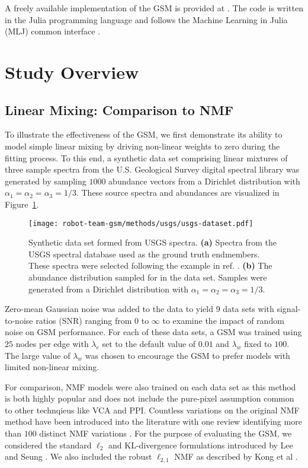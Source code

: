 A freely available implementation of the GSM is provided at \cite{gtm-code}. The
code is written in the Julia programming language and follows the Machine
Learning in Julia (MLJ) common interface \cite{bezanson2012julia, blaom2020mlj}.


\section{Study Overview}

\subsection{Linear Mixing: Comparison to NMF}\label{sec:experiments}

To illustrate the effectiveness of the GSM, we first demonstrate its ability to
model simple linear mixing by driving non-linear weights to zero during the
fitting process. To this end, a synthetic data set comprising linear mixtures of
three sample spectra from the U.S. Geological Survey digital spectral library
\cite{usgs-spectra} was generated by sampling $1000$ abundance vectors from a
Dirichlet distribution with $\alpha_1=\alpha_2=\alpha_3=1/3$. These source
spectra and abundances are visualized in Figure~\ref{fig:usgs-data}.

\begin{figure}[H]
  \centering
  \texttt{[image: robot-team-gsm/methods/usgs/usgs-dataset.pdf]}
  \caption{Synthetic data set formed from USGS spectra. \textbf{(a)} Spectra
    from the USGS spectral database used as the ground truth endmembers. These
    spectra were selected following the example in ref. \cite{vca-orig}.
    \textbf{(b)} The abundance distribution sampled for in the data set. Samples
    were generated from a Dirichlet distribution with
    $\alpha_1=\alpha_2=\alpha_3=1/3$.}
  \label{fig:usgs-data}
\end{figure}

Zero-mean Gaussian noise was added to the data to yield $9$ data sets with
signal-to-noise ratios (SNR) ranging from $0$ to $\infty$ to examine the impact
of random noise on GSM performance. For each of these data sets, a GSM was
trained using $25$ nodes per edge with $\lambda_e$ set to the default value of
$0.01$ and $\lambda_w$ fixed to $100$. The large value of $\lambda_w$ was chosen
to encourage the GSM to prefer models with limited non-linear mixing.


For comparison, NMF models were also trained on each data set as this method is
both highly popular and does not include the pure-pixel assumption common to
other technqieus like VCA and PPI. Countless variations on the original NMF
method have been introduced into the literature with one review identifying more
than $100$ distinct NMF variations \cite{unmixing-nmf-review}. For the purpose
of evaluating the GSM, we considered the standard $\ell_2$ and KL-divergence
formulations introduced by Lee and Seung \cite{nmf-algorithms}. We also included
the robust $\ell_{2,1}$ NMF as described by Kong et al \cite{nmf-l21}.


